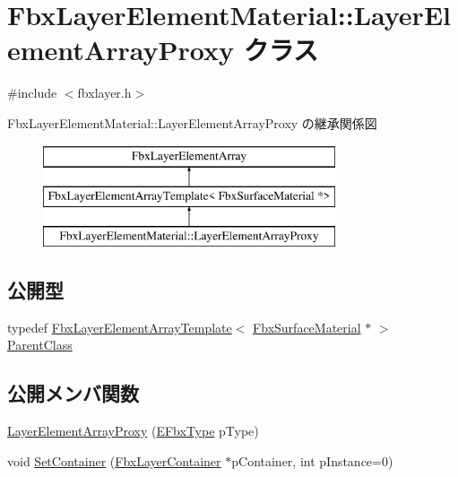 \hypertarget{class_fbx_layer_element_material_1_1_layer_element_array_proxy}{}\section{Fbx\+Layer\+Element\+Material\+:\+:Layer\+Element\+Array\+Proxy クラス}
\label{class_fbx_layer_element_material_1_1_layer_element_array_proxy}


{\ttfamily \#include $<$fbxlayer.\+h$>$}

Fbx\+Layer\+Element\+Material\+:\+:Layer\+Element\+Array\+Proxy の継承関係図\begin{figure}[H]
\begin{center}
\leavevmode
\includegraphics[height=3.000000cm]{class_fbx_layer_element_material_1_1_layer_element_array_proxy}
\end{center}
\end{figure}
\subsection*{公開型}
\begin{DoxyCompactItemize}
\item 
typedef \hyperlink{class_fbx_layer_element_array_template}{Fbx\+Layer\+Element\+Array\+Template}$<$ \hyperlink{class_fbx_surface_material}{Fbx\+Surface\+Material} $\ast$ $>$ \hyperlink{class_fbx_layer_element_material_1_1_layer_element_array_proxy_a20356a1bce1797b2acfcd42ba5082dd8}{Parent\+Class}
\end{DoxyCompactItemize}
\subsection*{公開メンバ関数}
\begin{DoxyCompactItemize}
\item 
\hyperlink{class_fbx_layer_element_material_1_1_layer_element_array_proxy_a92c188964960704f5a2310b53a974109}{Layer\+Element\+Array\+Proxy} (\hyperlink{fbxpropertytypes_8h_a73913a5ddfb20e57c6f25e9e6784bd92}{E\+Fbx\+Type} p\+Type)
\item 
void \hyperlink{class_fbx_layer_element_material_1_1_layer_element_array_proxy_a8772c8cf8d76dbdcb5d4019ef29d6af0}{Set\+Container} (\hyperlink{class_fbx_layer_container}{Fbx\+Layer\+Container} $\ast$p\+Container, int p\+Instance=0)
\end{DoxyCompactItemize}
